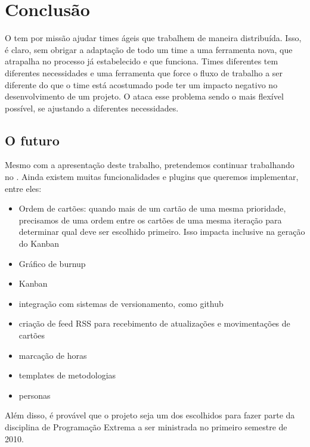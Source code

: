 \section{Conclusão}

O \calopsita{} tem por missão ajudar times ágeis que trabalhem de maneira distribuída. Isso, é claro, sem obrigar
a adaptação de todo um time a uma ferramenta nova, que atrapalha no processo já estabelecido e que funciona. Times
diferentes tem diferentes necessidades e uma ferramenta que force o fluxo de trabalho a ser diferente do que o time 
está acostumado pode ter um impacto negativo no desenvolvimento de um projeto. O \calopsita{} ataca esse problema
sendo o mais flexível possível, se ajustando a diferentes necessidades.

\subsection{O futuro}

Mesmo com a apresentação deste trabalho, pretendemos continuar trabalhando no \calopsita{}. Ainda existem muitas funcionalidades
e plugins que queremos implementar, entre eles:

\begin{itemize}
	\item{Ordem de cartões: quando mais de um cartão de uma mesma prioridade, precisamos de uma ordem entre os cartões de uma
	mesma iteração para determinar qual deve ser escolhido primeiro. Isso impacta inclusive na geração do Kanban}
	\item{Gráfico de burnup}
	\item{Kanban}
	\item{integração com sistemas de versionamento, como github}
	\item{criação de feed RSS para recebimento de atualizações e movimentações de cartões}
	\item{marcação de horas}
	\item{templates de metodologias}
	\item{personas}
\end{itemize}

Além disso, é provável que o projeto seja um dos escolhidos para fazer parte da disciplina de Programação Extrema a ser
ministrada no primeiro semestre de 2010.